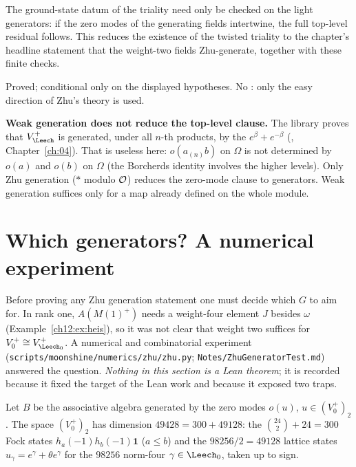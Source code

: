 \begin{physics}
The ground-state datum of the triality need only be checked on the light generators: if the zero modes of the generating fields intertwine, the full top-level residual follows. This reduces the existence of the twisted triality to the chapter's headline statement that the weight-two fields Zhu-generate, together with these finite checks.
\end{physics}
\begin{status}Proved; conditional only on the displayed hypotheses.  No : only the
easy direction of Zhu's theory is used.\end{status}

\begin{warning}
\textbf{Weak generation does not reduce the top-level clause.}  The library proves that
$V_\Leech^+$ is generated, under all $n$-th products, by the $e^\beta+e^{-\beta}$
(, Chapter~\ref{ch:04}).  That is useless here: $o(a_{(n)}b)$ on $\Omega$ is not
determined by $o(a)$ and $o(b)$ on $\Omega$ (the Borcherds identity involves the higher levels).  Only
Zhu generation ($\ast$ modulo $\mathcal{O}$) reduces the zero-mode clause to generators.  Weak
generation suffices only for a map already defined on the whole module.
\end{warning}

\section{Which generators? A numerical experiment}\label{ch12:sec:numerics}

Before proving any Zhu generation statement one must decide which $G$ to aim for.  In rank one,
$A(M(1)^+)$ needs a weight-four element $J$ besides $\omega$ (Example~\ref{ch12:ex:heis}), so it was
not clear that weight two suffices for $V_0^+\cong V_{\Leech_0}^+$.  A numerical and combinatorial
experiment (\texttt{scripts/moonshine/numerics/zhu/zhu.py}; \texttt{Notes/ZhuGeneratorTest.md})
answered the question.  \emph{Nothing in this section is a Lean theorem}; it is recorded because it
fixed the target of the Lean work and because it exposed two traps.

Let $B$ be the associative algebra generated by the zero modes $o(u)$, $u\in(V_0^+)_2$.  The space
$(V_0^+)_2$ has dimension $49428=300+49128$: the $\binom{24}{2}+24=300$ Fock states $h_a(-1)h_b(-1)\mathbf 1$
($a\le b$) and the $98256/2=49128$ lattice states $u_\gamma=e^\gamma+\theta e^\gamma$ for the $98256$ norm-four $\gamma\in\Leech_0$,
taken up to sign.

